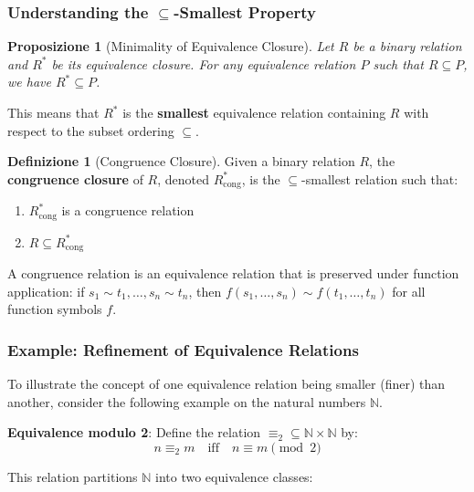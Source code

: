 \documentclass[11pt,a4paper]{article}
\theoremstyle{definition}
\newtheorem{definition}{Definizione}[section]
\theoremstyle{plain}
\newtheorem{proposition}[theorem]{Proposizione}
\theoremstyle{remark}
\newcommand{\N}{\mathbb{N}}
\begin{document}
\subsubsection{Understanding the $\subseteq$-Smallest Property}

\begin{proposition}[Minimality of Equivalence Closure]
Let $R$ be a binary relation and $R^*$ be its equivalence closure. For any equivalence relation $P$ such that $R \subseteq P$, we have $R^* \subseteq P$.
\end{proposition}

This means that $R^*$ is the \textbf{smallest} equivalence relation containing $R$ with respect to the subset ordering $\subseteq$.

\begin{definition}[Congruence Closure]
Given a binary relation $R$, the \textbf{congruence closure} of $R$, denoted $R^*_{\text{cong}}$, is the $\subseteq$-smallest relation such that:
\begin{enumerate}
    \item $R^*_{\text{cong}}$ is a congruence relation
    \item $R \subseteq R^*_{\text{cong}}$
\end{enumerate}
\end{definition}

A congruence relation is an equivalence relation that is preserved under function application: if $s_1 \sim t_1, \dots, s_n \sim t_n$, then $f(s_1, \dots, s_n) \sim f(t_1, \dots, t_n)$ for all function symbols $f$.

\subsubsection{Example: Refinement of Equivalence Relations}

To illustrate the concept of one equivalence relation being smaller (finer) than another, consider the following example on the natural numbers $\N$.

\textbf{Equivalence modulo 2}: Define the relation $\equiv_2 \subseteq \N \times \N$ by:
\[
n \equiv_2 m \quad \text{iff} \quad n \equiv m \pmod{2}
\]

This relation partitions $\N$ into two equivalence classes:
\begin{center}
\end{center}
\end{document}
